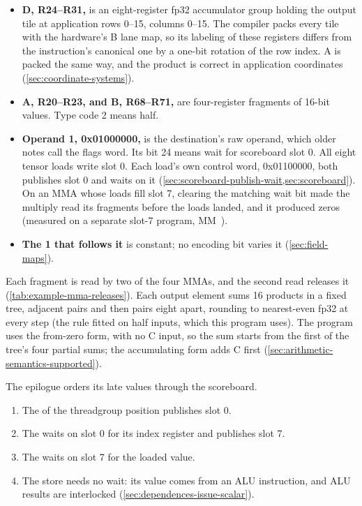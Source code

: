 \begin{itemize}
\item \textbf{D, R24–R31,} is an eight-register fp32 accumulator group holding the output tile at application rows
  0–15, columns 0–15. The compiler packs every tile with the hardware's B lane map, so its labeling of these registers
  differs from the instruction's canonical one by a one-bit rotation of the row index. A is packed the same way, and
  the product is correct in application coordinates (\cref{sec:coordinate-systems}).
\item \textbf{A, R20–R23, and B, R68–R71,} are four-register fragments of 16-bit values. Type code 2 means half.
\item \textbf{Operand 1, 0x01000000,} is the destination's raw operand, which older notes call the flags word. Its
  bit 24 means wait for scoreboard slot 0. All eight tensor loads write slot 0. Each
  load's own control word, 0x01100000, both publishes slot 0 and waits on it (\cref{sec:scoreboard-publish-wait,sec:scoreboard}). On an MMA
  whose loads fill slot 7, clearing the matching wait bit made the multiply read its fragments before the loads landed,
  and it produced zeros (measured on a separate slot-7 program, MM~).
\item \textbf{The 1 that follows it} is constant; no encoding bit varies it (\cref{sec:field-maps}).
\end{itemize}

Each fragment is read by two of the four MMAs, and the second read releases it (\cref{tab:example-mma-releases}). Each output element sums 16
products in a fixed tree, adjacent pairs and then pairs eight apart, rounding to nearest-even fp32 at every step (the
rule fitted on half inputs, which this program uses). The program uses the from-zero form, with no C input, so the
sum starts from the first of the tree's four partial sums; the accumulating form adds C first
(\cref{sec:arithmetic-semantics-supported}).

The epilogue orders its late values through the scoreboard.

\begin{enumerate}
\def\labelenumi{\arabic{enumi}.}
\item The  of the threadgroup position publishes slot 0.
\item The  waits on slot 0 for its index register and publishes slot 7.
\item The  waits on slot 7 for the loaded value.
\item The store needs no wait: its value comes from an ALU instruction, and ALU results are interlocked (\cref{sec:dependences-issue-scalar}).
\end{enumerate}

